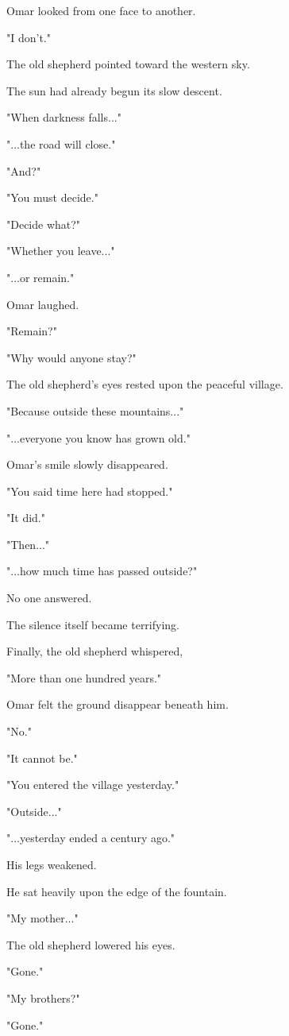\documentclass[12pt,openany]{book}
\begin{document}
Omar looked from one face to another.

"I don't."

The old shepherd pointed toward the western sky.

The sun had already begun its slow descent.

"When darkness falls..."

"...the road will close."

"And?"

"You must decide."

"Decide what?"

"Whether you leave..."

"...or remain."

Omar laughed.

"Remain?"

"Why would anyone stay?"

The old shepherd's eyes rested upon the peaceful village.

"Because outside these mountains..."

"...everyone you know has grown old."

Omar's smile slowly disappeared.

"You said time here had stopped."

"It did."

"Then..."

"...how much time has passed outside?"

No one answered.

The silence itself became terrifying.

Finally, the old shepherd whispered,

"More than one hundred years."

Omar felt the ground disappear beneath him.

"No."

"It cannot be."

"You entered the village yesterday."

"Outside..."

"...yesterday ended a century ago."

His legs weakened.

He sat heavily upon the edge of the fountain.

"My mother..."

The old shepherd lowered his eyes.

"Gone."

"My brothers?"

"Gone."
\end{document}
